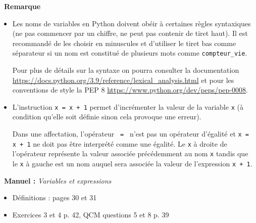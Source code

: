 \documentclass[a4paper, french, 12pt]{article}  %
\newcounter{rque}
\newenvironment{remarque}
{\par \medskip    \addtocounter{rque}{1} \noindent  
\begin{bclogo}[arrondi =0.1,  ombre = true, barre=snake, noborder = true, logo=\bcinfo, marge=0]{~\textbf{Remarque} \textbf{\therque}}  \par }
{
\end{bclogo}
 \par \bigskip }
\newenvironment{manuel}[1]
{\par \medskip  \noindent  
\begin{bclogo}[arrondi =0.1,   noborder = true, logo=\bcoeil, marge=4]{~\textbf{Manuel :}  {\itshape #1} }  \itshape \par}
{
\end{bclogo}
 \par \bigskip }
\begin{document}
\begin{remarque}{}

\begin{itemize}
\item Les noms de variables en Python doivent obéir à certaines règles syntaxiques (ne pas commencer par un chiffre, ne peut pas contenir de tiret haut). Il est recommandé de les choisir en minuscules et d'utiliser le tiret bas comme séparateur si un nom est constitué de plusieurs mots comme \verb+compteur_vie+.

Pour plus de détails sur la syntaxe on pourra consulter la documentation \url{https://docs.python.org/3.9/reference/lexical_analysis.html} et pour les conventions de style la PEP 8 \url{https://www.python.org/dev/peps/pep-0008}.


\item L'instruction \texttt{x = x + 1} permet d'incrémenter la valeur de la variable \texttt{x} (à  condition qu'elle soit définie sinon cela provoque une erreur). 

\bcdanger{}  Dans une affectation, l'opérateur \texttt{ = } n'est pas un opérateur d'égalité et \texttt{x = x + 1} ne doit pas être interprété comme une égalité. Le \texttt{x} à  droite de l'opérateur représente la valeur associée précédemment au nom \texttt{x} tandis que le \texttt{x} à gauche est un nom auquel sera associée la valeur de l'expression \texttt{x + 1}. 

\end{itemize}

\end{remarque}

\begin{manuel}{Variables et expressions}
\begin{itemize}[label=]
 \item Définitions  : pages 30 et 31
 \item Exercices 3 et 4 p. 42, QCM questions 5 et 8  p. 39
\end{itemize}
\end{manuel}
\end{document}
